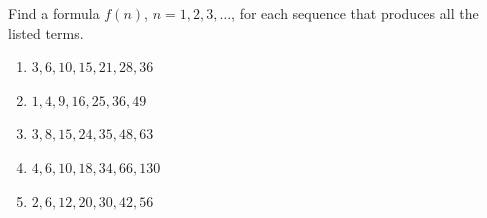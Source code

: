 Find a formula $f(n)$, $n=1,2,3,\dots$, for each sequence that produces all the listed terms.
\begin{enumerate}
\item[(a)] $3,6,10,15,21,28,36$
\item[(b)] $1,4,9,16,25,36,49$
\item[(c)] $3,8,15,24,35,48,63$
\item[(d)] $4,6,10,18,34,66,130$
\item[(e)] $2,6,12,20,30,42,56$
\end{enumerate}
